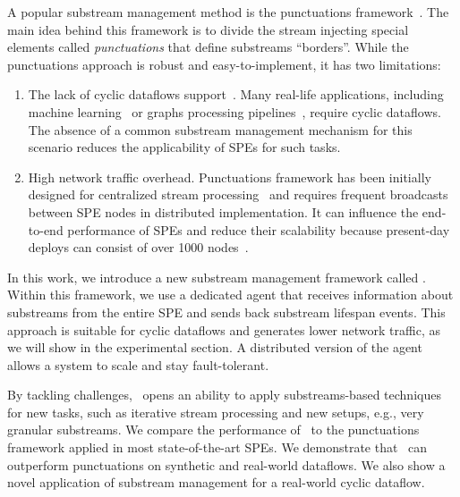 A popular substream management method is the punctuations framework~\cite{tucker2003exploiting}. The main idea behind this framework is to divide the stream injecting special elements called {\em punctuations} that define substreams ``borders''. While the punctuations approach is robust and easy-to-implement, it has two limitations:
\begin{enumerate}
    \item The lack of cyclic dataflows support~\cite{carbone2018scalable}. Many real-life applications, including machine learning~\cite{webirte} or graphs processing pipelines~\cite{xu2018fault}, require cyclic dataflows. The absence of a common substream management mechanism for this scenario reduces the applicability of SPEs for such tasks.
    \item High network traffic overhead. Punctuations framework has been initially designed for centralized stream processing~\cite{Tucker:2003:EPS:776752.776780} and requires frequent broadcasts between SPE nodes in distributed implementation. It can influence the end-to-end performance of SPEs and reduce their scalability because present-day deploys can consist of over 1000 nodes~\cite{Carbone:2017:SMA:3137765.3137777}. 
\end{enumerate}

In this work, we introduce a new substream management framework called \tracker. Within this framework, we use a dedicated agent that receives information about substreams from the entire SPE and sends back substream lifespan events. This approach is suitable for cyclic dataflows and generates lower network traffic, as we will show in the experimental section. A distributed version of the agent allows a system to scale and stay fault-tolerant.

By tackling challenges, \tracker\ opens an ability to apply substreams-based techniques for new tasks, such as iterative stream processing and new setups, e.g., very granular substreams. We compare the performance of \tracker\ to the punctuations framework applied in most state-of-the-art SPEs. We demonstrate that \tracker\ can outperform punctuations on synthetic and real-world dataflows. We also show a novel application of substream management for a real-world cyclic dataflow. 

